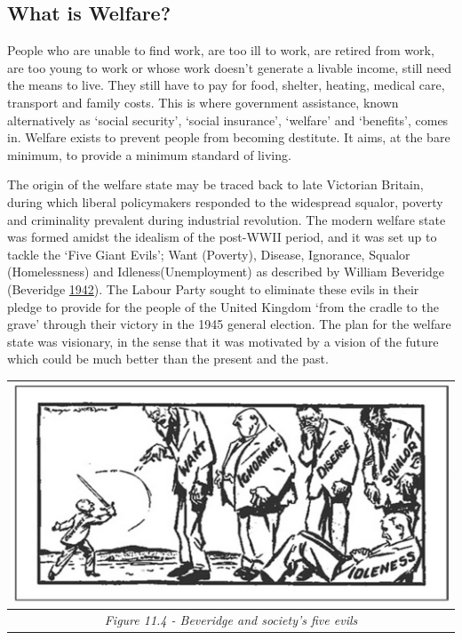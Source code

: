 \documentclass[]{tufte-handout}
\begin{document}
\hypertarget{what-is-welfare}{%
\subsection{What is Welfare?}\label{what-is-welfare}}

People who are unable to find work, are too ill to work, are retired
from work, are too young to work or whose work doesn't generate a
livable income, still need the means to live. They still have to pay for
food, shelter, heating, medical care, transport and family costs. This
is where government assistance, known alternatively as `social
security', `social insurance', `welfare' and `benefits', comes in.
Welfare exists to prevent people from becoming destitute. It aims, at
the bare minimum, to provide a minimum standard of living.

The origin of the welfare state may be traced back to late Victorian
Britain, during which liberal policymakers responded to the widespread
squalor, poverty and criminality prevalent during industrial revolution.
The modern welfare state was formed amidst the idealism of the post-WWII
period, and it was set up to tackle the `Five Giant Evils'; Want
(Poverty), Disease, Ignorance, Squalor (Homelessness) and
Idleness(Unemployment) as described by William Beveridge (Beveridge
\protect\hyperlink{ref-Beveridge1942}{1942}). The Labour Party sought to
eliminate these evils in their pledge to provide for the people of the
United Kingdom `from the cradle to the grave' through their victory in
the 1945 general election. The plan for the welfare state was visionary,
in the sense that it was motivated by a vision of the future which could
be much better than the present and the past.

\begin{longtable}[]{@{}c@{}}
\toprule
\includegraphics{ChapterPictures/11-4-BeveridgeEvils.jpg}\tabularnewline
\midrule
\endhead
\emph{Figure 11.4 - Beveridge and society's five evils}\tabularnewline
\bottomrule
\end{longtable}
\end{document}
